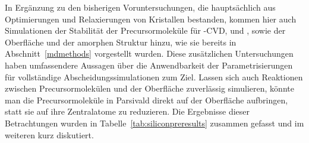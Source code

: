 In Ergänzung zu den bisherigen Voruntersuchungen, die hauptsächlich aus Optimierungen und Relaxierungen von Kristallen bestanden, kommen hier auch Simulationen der Stabilität der Precursormoleküle für -CVD,  und , sowie der Oberfläche und der amorphen Struktur hinzu, wie sie bereits in Abschnitt~\ref{mdmethods} vorgestellt wurden.
Diese zusätzlichen Untersuchungen haben umfassendere Aussagen über die Anwendbarkeit der Parametrisierungen für vollständige Abscheidungssimulationen zum Ziel.
Lassen sich auch Reaktionen zwischen Precursormolekülen und der Oberfläche zuverlässig simulieren, könnte man die Precursormoleküle in Parsivald direkt auf der Oberfläche aufbringen, statt sie auf ihre Zentralatome zu reduzieren.
Die Ergebnisse dieser Betrachtungen wurden in Tabelle~\ref{tab:siliconpreresults} zusammen gefasst und im weiteren kurz diskutiert.

